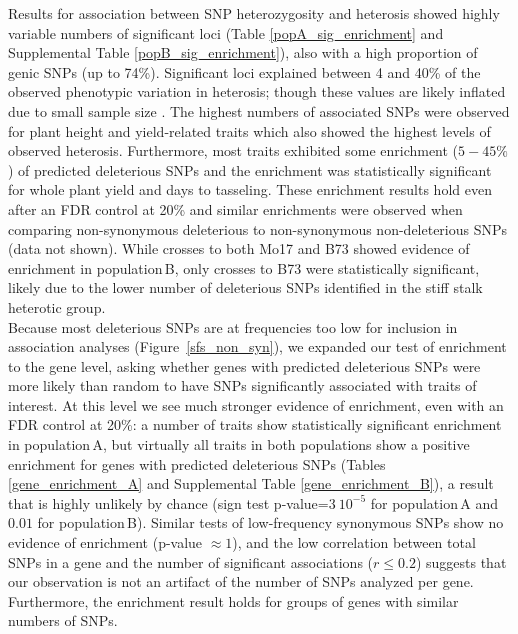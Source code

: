 \documentclass[12pt]{article}
\begin{document}
Results for association between SNP heterozygosity and heterosis showed highly variable numbers of significant loci (Table \ref{popA_sig_enrichment} and Supplemental Table \ref{popB_sig_enrichment}), also with a high proportion of genic SNPs (up to 74\%). Significant loci explained between 4 and 40\% of the observed phenotypic variation in heterosis; though these values are likely inflated due to small sample size \citep{Beavis1994}. The highest numbers of associated SNPs were observed for plant height and yield-related traits which also showed the highest levels of observed heterosis. 
Furthermore, most traits exhibited some enrichment ($5-45\%$) of predicted deleterious SNPs and the enrichment was statistically significant for whole plant yield and days to tasseling. These enrichment results hold even after an FDR control at 20\% and similar enrichments were observed when comparing non-synonymous deleterious to non-synonymous non-deleterious SNPs (data not shown). While crosses to both Mo17 and B73 showed evidence of enrichment in population\,B, only crosses to B73 were statistically significant, likely due to the lower number of deleterious SNPs identified in the stiff stalk heterotic group.\\
%

Because most deleterious SNPs are at frequencies too low for inclusion in association analyses (Figure~\ref{sfs_non_syn}), we expanded our test of enrichment to the gene level, asking whether genes with predicted deleterious SNPs were more likely than random to have SNPs significantly associated with traits of interest. At this level we see much stronger evidence of enrichment, even with an FDR control at 20\%: a number of traits show statistically significant enrichment in population\,A, but virtually all traits in both populations show a positive enrichment for genes with predicted deleterious SNPs (Tables \ref{gene_enrichment_A} and Supplemental Table \ref{gene_enrichment_B}), a result that is highly unlikely by chance (sign test p-value=$3\ 10^{-5}$ for population\,A and $0.01$ for population\,B). Similar tests of low-frequency synonymous SNPs show no evidence of enrichment (p-value $\approx 1$), and the low correlation between total SNPs in a gene and the number of significant associations ($r\leq 0.2$) suggests that our observation is not an artifact of the number of SNPs analyzed per gene. Furthermore, the enrichment result holds for groups of genes with similar numbers of SNPs.
\end{document}
